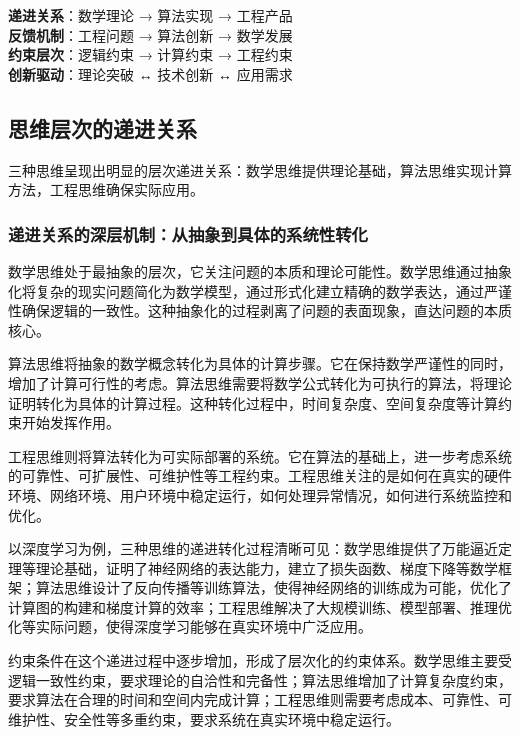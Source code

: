 \begin{tcolorbox}[colback=red!5!white,colframe=red!75!black,title=协同关系：三种思维的融合模式]
\textbf{递进关系}：数学理论 → 算法实现 → 工程产品\\
\textbf{反馈机制}：工程问题 → 算法创新 → 数学发展\\
\textbf{约束层次}：逻辑约束 → 计算约束 → 工程约束\\
\textbf{创新驱动}：理论突破 ↔ 技术创新 ↔ 应用需求
\end{tcolorbox}

\subsection{思维层次的递进关系}

三种思维呈现出明显的层次递进关系：数学思维提供理论基础，算法思维实现计算方法，工程思维确保实际应用。

\subsubsection{递进关系的深层机制：从抽象到具体的系统性转化}

数学思维处于最抽象的层次，它关注问题的本质和理论可能性。数学思维通过抽象化将复杂的现实问题简化为数学模型，通过形式化建立精确的数学表达，通过严谨性确保逻辑的一致性。这种抽象化的过程剥离了问题的表面现象，直达问题的本质核心。

算法思维将抽象的数学概念转化为具体的计算步骤。它在保持数学严谨性的同时，增加了计算可行性的考虑。算法思维需要将数学公式转化为可执行的算法，将理论证明转化为具体的计算过程。这种转化过程中，时间复杂度、空间复杂度等计算约束开始发挥作用。

工程思维则将算法转化为可实际部署的系统。它在算法的基础上，进一步考虑系统的可靠性、可扩展性、可维护性等工程约束。工程思维关注的是如何在真实的硬件环境、网络环境、用户环境中稳定运行，如何处理异常情况，如何进行系统监控和优化。

以深度学习为例，三种思维的递进转化过程清晰可见：数学思维提供了万能逼近定理等理论基础，证明了神经网络的表达能力，建立了损失函数、梯度下降等数学框架；算法思维设计了反向传播等训练算法，使得神经网络的训练成为可能，优化了计算图的构建和梯度计算的效率；工程思维解决了大规模训练、模型部署、推理优化等实际问题，使得深度学习能够在真实环境中广泛应用。

约束条件在这个递进过程中逐步增加，形成了层次化的约束体系。数学思维主要受逻辑一致性约束，要求理论的自洽性和完备性；算法思维增加了计算复杂度约束，要求算法在合理的时间和空间内完成计算；工程思维则需要考虑成本、可靠性、可维护性、安全性等多重约束，要求系统在真实环境中稳定运行。

